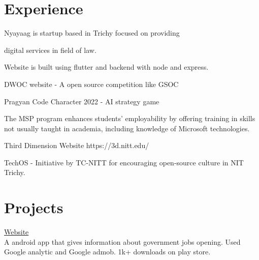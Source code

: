 \documentclass[]{deedy-resume-openfont}
\begin{document}
\hfill
\begin{minipage}[t]{0.69\textwidth} 

%
%
\section{Experience}
\hfill {}
\begin{tightemize}
    \item Nyayaag is startup based in Trichy focused on providing 
    
    digital services in field of law.
	\item Website is built using flutter and backend with node and express.
\end{tightemize}
\hfill {}
\begin{tightemize}
	\item DWOC website - A open source competition like GSOC
	\item Pragyan Code Character 2022 - AI strategy game
\end{tightemize}
\hfill {}
\begin{tightemize}
	\item The MSP program enhances students' employability by offering training in skills not usually taught in academia, including knowledge of Microsoft technologies.
\end{tightemize}
\hfill {}
\begin{tightemize}
	\item Third Dimension Website https://3d.nitt.edu/
	\item TechOS - Initiative by TC-NITT for encouraging open-source culture in NIT Trichy.
\end{tightemize}
\sectionsep
%
%
\section{Projects}
\raggedright

\hfill \href{https://play.google.com/store/apps/details?id=com.amostrone.akash.sanjeevwebsolutions}{Website}\\
A android app that gives information about government jobs opening. Used Google analytic and Google admob. 1k+ downloads on play store.\\
\sectionsep


\end{minipage}
\end{document}
